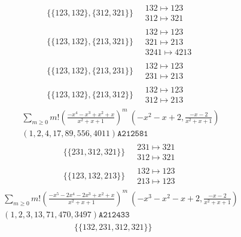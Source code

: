 \begin{scriptsize}
\begin{align}
\\
\{\{123, 132\}, \{312, 321\}\}
\ 
&
\begin{matrix}
132 \mapsto 123
\\
312 \mapsto 321
\end{matrix}
\\
\{\{123, 132\}, \{213, 321\}\}
\ 
&
\begin{matrix}
132 \mapsto 123
\\
321 \mapsto 213
\\
3241 \mapsto 4213
\end{matrix}
\\
\{\{123, 132\}, \{213, 231\}\}
\ 
&
\begin{matrix}
132 \mapsto 123
\\
231 \mapsto 213
\end{matrix}
\\
\{\{123, 132\}, \{213, 312\}\}
\ 
&
\begin{matrix}
132 \mapsto 123
\\
312 \mapsto 213
\end{matrix}
\end{align}
$$
\begin{matrix}
\sum_{m \geq 0} m! \left(
\frac{-x^{4} - x^{3} + x^{2} + x}{x^{2} + x + 1}
\right)^m
\ 
\left(-x^{2} - x + 2, \frac{-x - 2}{x^{2} + x + 1}\right)
\\
\left(1, 2, 4, 17, 89, 556, 4011\right)
\texttt{A212581}
\end{matrix}
$$
\begin{align}
\{\{231, 312, 321\}\}
\ 
&
\begin{matrix}
231 \mapsto 321
\\
312 \mapsto 321
\end{matrix}
\\
\{\{123, 132, 213\}\}
\ 
&
\begin{matrix}
132 \mapsto 123
\\
213 \mapsto 123
\end{matrix}
\end{align}
$$
\begin{matrix}
\sum_{m \geq 0} m! \left(
\frac{-x^{5} - 2 x^{4} - 2 x^{3} + x^{2} + x}{x^{2} + x + 1}
\right)^m
\ 
\left(-x^{3} - x^{2} - x + 2, \frac{-x - 2}{x^{2} + x + 1}\right)
\\
\left(1, 2, 3, 13, 71, 470, 3497\right)
\texttt{A212433}
\end{matrix}
$$
\begin{align}
\{\{132, 231, 312, 321\}\}
\ 
&
\begin{matrix}

\end{matrix}
\end{align}
\end{scriptsize}
